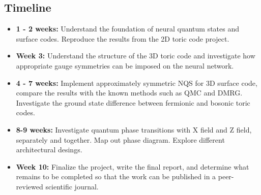 \documentclass{article}
\begin{document}
\subsection{Timeline}
\begin{itemize}
    \item \textbf{1 - 2 weeks:} Understand the foundation of neural quantum states and surface codes. Reproduce the results from the 2D toric code project. 
    \item \textbf{Week 3:} Understand the structure of the 3D toric code and investigate how appropriate gauge symmetries can be imposed on the neural network. 
    \item \textbf{4 - 7 weeks:} Implement approximately symmetric NQS for 3D surface code, compare the results with the known methods such as QMC and DMRG. Investigate the ground state difference between fermionic and bosonic toric codes. 
    \item  \textbf{8-9 weeks:} Investigate quantum phase transitions with X field and Z field, separately and together. Map out phase diagram. Explore different architectural desings.
    \item \textbf{Week 10:} Finalize the project, write the final report, and determine what remains to be completed so that the work can be published in a peer-reviewed scientific journal.
\end{itemize}
\end{document}
